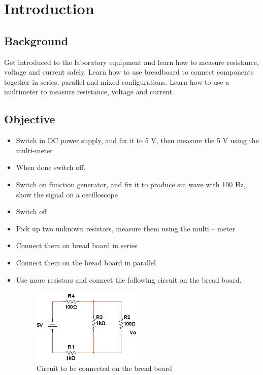 \documentclass[a4paper, 10pt]{article}
\begin{document}
	\tableofcontents
	\pagebreak
	
	\listoffigures
	\pagebreak
	
	\section{Introduction}
		\subsection{Background}
			Get introduced to the laboratory equipment and learn how to measure resistance, voltage and current safely. Learn how to use breadboard to connect components together in series, parallel and mixed configurations. Learn how to use a multimeter to measure resistance, voltage and current.	
		\subsection{Objective}
			\begin{itemize}
				\item Switch in DC power supply, and fix it to 5 V, then measure the 5 V using the multi-meter
				\item When done switch off.
				\item Switch on function generator, and fix it to produce sin wave with 100 Hz, show the signal on a oscilloscope
				\item Switch off
				\item Pick up two unknown resistors, measure them using the multi – meter
				\item Connect them on bread board in series
				\item Connect them on the bread board in parallel
				\item Use more resistors and connect the following circuit on the bread board.
				\begin{figure}[h]
					\centering
					\includegraphics[width=0.5\textwidth]{./images/Task8-Circuit.png}
					\caption{Circuit to be connected on the bread board}
					\label{fig:Task8-Circuit}
				\end{figure}
			\end{itemize}
\end{document}
